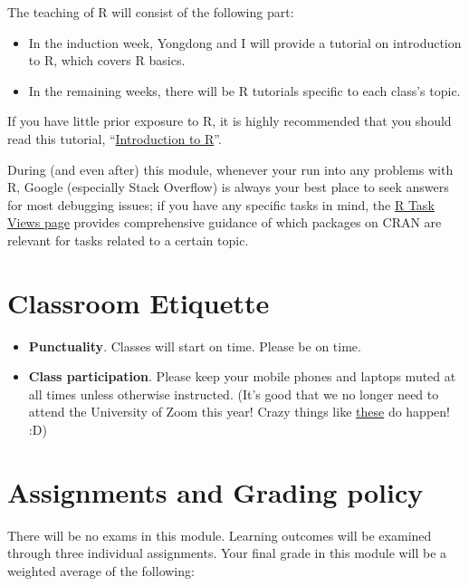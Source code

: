 \documentclass[
  11pt,
]{book}
\providecommand{\tightlist}{%
  \setlength{\itemsep}{0pt}\setlength{\parskip}{0pt}}
\begin{document}
The teaching of R will consist of the following part:

\begin{itemize}
\tightlist
\item
  In the induction week, Yongdong and I will provide a tutorial on introduction to R, which covers R basics.
\item
  In the remaining weeks, there will be R tutorials specific to each class's topic.
\end{itemize}

If you have little prior exposure to R, it is highly recommended that you should read this tutorial, ``\href{https://cran.r-project.org/doc/manuals/r-release/R-intro.pdf}{Introduction to R}''.

During (and even after) this module, whenever your run into any problems with R, Google (especially Stack Overflow) is always your best place to seek answers for most debugging issues; if you have any specific tasks in mind, the \href{https://cran.r-project.org/web/views/}{R Task Views page} provides comprehensive guidance of which packages on CRAN are relevant for tasks related to a certain topic.

\hypertarget{classroom-etiquette}{%
\section{Classroom Etiquette}\label{classroom-etiquette}}

\begin{itemize}
\item
  \textbf{Punctuality}. Classes will start on time. Please be on time.
\item
  \textbf{Class participation}. Please keep your mobile phones and laptops muted at all times unless otherwise instructed. (It's good that we no longer need to attend the University of Zoom this year! Crazy things like \href{https://www.youtube.com/watch?v=yZpEpNPaxsw}{these} do happen! :D)
\end{itemize}

\hypertarget{assignments-and-grading-policy}{%
\section{Assignments and Grading policy}\label{assignments-and-grading-policy}}

There will be no exams in this module. Learning outcomes will be examined through three individual assignments. Your final grade in this module will be a weighted average of the following:
\end{document}
